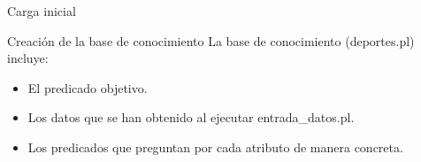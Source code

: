 \begin{frame}{Carga inicial}
 \begin{block}{Creación de la base de conocimiento}
La base de conocimiento (deportes.pl) incluye:
\begin{itemize}
 \item El predicado objetivo.
 \item Los datos que se han obtenido al ejecutar entrada\_datos.pl.
 \item Los predicados que preguntan por cada atributo de manera concreta.
\end{itemize}
 \end{block}
\end{frame}
